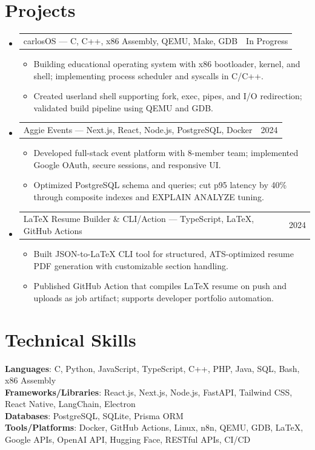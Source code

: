 \documentclass[letterpaper,11pt]{article}
\makeatletter
\newcommand{\resumeItem}[1]{
  \item\small{{#1 \vspace{-2pt}}}
}
\newcommand{\resumeProjectHeading}[2]{
    \item
    \begin{tabular*}{0.97\textwidth}{l@{\extracolsep{\fill}}r}
      \small#1 & #2 \\
    \end{tabular*}\vspace{-7pt}
}
\newcommand{\resumeSubHeadingListStart}{\begin{itemize}[leftmargin=0.15in, label={}]}
\newcommand{\resumeSubHeadingListEnd}{\end{itemize}}
\newcommand{\resumeItemListStart}{\begin{itemize}}
\newcommand{\resumeItemListEnd}{\end{itemize}\vspace{-5pt}}
\makeatother
\begin{document}
\section{Projects}
\resumeSubHeadingListStart
  \resumeProjectHeading
    {carlosOS — C, C++, x86 Assembly, QEMU, Make, GDB}{In Progress}
    \resumeItemListStart
      \resumeItem{Building educational operating system with x86 bootloader, kernel, and shell; implementing process scheduler and syscalls in C/C++.}
      \resumeItem{Created userland shell supporting fork, exec, pipes, and I/O redirection; validated build pipeline using QEMU and GDB.}
    \resumeItemListEnd

  \resumeProjectHeading
    {Aggie Events — Next.js, React, Node.js, PostgreSQL, Docker}{2024}
    \resumeItemListStart
      \resumeItem{Developed full-stack event platform with 8-member team; implemented Google OAuth, secure sessions, and responsive UI.}
      \resumeItem{Optimized PostgreSQL schema and queries; cut p95 latency by 40\% through composite indexes and EXPLAIN ANALYZE tuning.}
    \resumeItemListEnd

  \resumeProjectHeading
    {LaTeX Resume Builder \& CLI/Action — TypeScript, LaTeX, GitHub Actions}{2024}
    \resumeItemListStart
      \resumeItem{Built JSON-to-LaTeX CLI tool for structured, ATS-optimized resume PDF generation with customizable section handling.}
      \resumeItem{Published GitHub Action that compiles LaTeX resume on push and uploads as job artifact; supports developer portfolio automation.}
    \resumeItemListEnd
\resumeSubHeadingListEnd

\section{Technical Skills}
\begin{itemize}[leftmargin=0.15in, label={}]
  \small{\item{
    \textbf{Languages}{: C, Python, JavaScript, TypeScript, C++, PHP, Java, SQL, Bash, x86 Assembly} \\
    \textbf{Frameworks/Libraries}{: React.js, Next.js, Node.js, FastAPI, Tailwind CSS, React Native, LangChain, Electron} \\
    \textbf{Databases}{: PostgreSQL, SQLite, Prisma ORM} \\
    \textbf{Tools/Platforms}{: Docker, GitHub Actions, Linux, n8n, QEMU, GDB, LaTeX, Google APIs, OpenAI API, Hugging Face, RESTful APIs, CI/CD}
  }}
\end{itemize}
\end{document}
